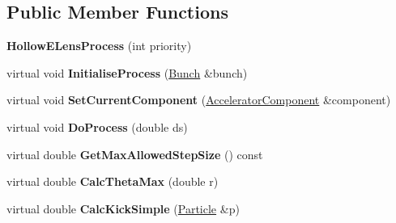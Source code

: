 \subsection*{Public Member Functions}
\begin{DoxyCompactItemize}
\item 
\mbox{\label{classParticleTracking_1_1HollowELensProcess_a0bc915216899b9b0e966d10c5ecdce4e}} 
{\bfseries Hollow\+E\+Lens\+Process} (int priority)
\item 
\mbox{\label{classParticleTracking_1_1HollowELensProcess_a35a560def2fd582aa9c43dd2d0145ebb}} 
virtual void {\bfseries Initialise\+Process} (\hyperlink{classBunch}{Bunch} \&bunch)
\item 
\mbox{\label{classParticleTracking_1_1HollowELensProcess_ad8e462ec2479abfed426aa70ad4a7d9b}} 
virtual void {\bfseries Set\+Current\+Component} (\hyperlink{classAcceleratorComponent}{Accelerator\+Component} \&component)
\item 
\mbox{\label{classParticleTracking_1_1HollowELensProcess_a6715ce136b7dba4afddeed508fcc7866}} 
virtual void {\bfseries Do\+Process} (double ds)
\item 
\mbox{\label{classParticleTracking_1_1HollowELensProcess_aecd39771258e06bd8b2c9ad321b2f746}} 
virtual double {\bfseries Get\+Max\+Allowed\+Step\+Size} () const
\item 
\mbox{\label{classParticleTracking_1_1HollowELensProcess_aa5c9b1efb62a97383d87a65c0ff78793}} 
virtual double {\bfseries Calc\+Theta\+Max} (double r)
\item 
\mbox{\label{classParticleTracking_1_1HollowELensProcess_a6fcfa90bb1c4bc9cb89ea6139e859041}} 
virtual double {\bfseries Calc\+Kick\+Simple} (\hyperlink{classPSvector}{Particle} \&p)
\item 
\mbox{\label{classParticleTracking_1_1HollowELensProcess_a4a56b57048ce38d560f310381b1a8a5e}} 

\end{DoxyCompactItemize}

